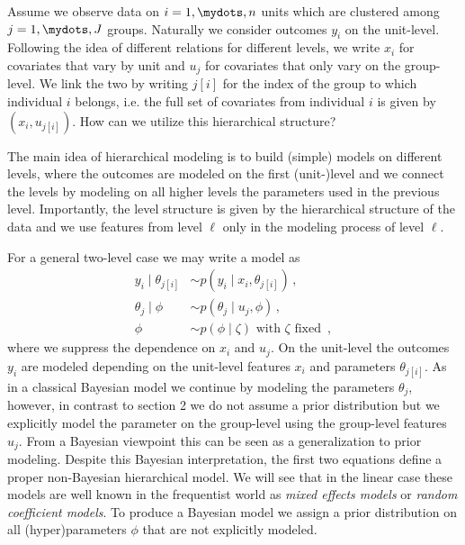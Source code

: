 \noindent
Assume we observe data on $i=1,\mydots,n$ units which are clustered among $j=1,\mydots,J$ groups.
Naturally we consider outcomes $y_i$ on the unit-level.
Following the idea of different relations for different levels, we write $x_i$ for covariates that vary by unit and $u_j$ for covariates that only vary on the group-level.
We link the two by writing $j[i]$ for the index of the group to which individual $i$ belongs, i.e. the full set of covariates from individual $i$ is given by $(x_i, u_{j[i]})$.
How can we utilize this hierarchical structure?

The main idea of hierarchical modeling is to build (simple) models on different levels, where the outcomes are modeled on the first (unit-)level and we connect the levels by modeling on all higher levels the parameters used in the previous level.
Importantly, the level structure is given by the hierarchical structure of the data and we use features from level $\ell$ only in the modeling process of level $\ell$.

For a general two-level case we may write a model as
\begin{align}
  y_i \mid \theta_{j[i]} &\sim p(y_i \mid x_i, \theta_{j[i]}) \,,\tag{Unit Level}\\
  \theta_j \mid \phi &\sim p(\theta_j \mid u_j, \phi) \,,\tag{Group Level}\\
  \phi &\sim p(\phi \mid \zeta) \text{ with } \zeta \text{ fixed } \,, \tag{Prior}
\end{align}
where we suppress the dependence on $x_i$ and $u_j$.
On the unit-level the outcomes $y_i$ are modeled depending on the unit-level features $x_i$ and parameters $\theta_{j[i]}$.
As in a classical Bayesian model we continue by modeling the parameters $\theta_j$, however, in contrast to section 2 we do not assume a prior distribution but we explicitly model the parameter on the group-level using the group-level features $u_j$.
From a Bayesian viewpoint this can be seen as a generalization to prior modeling.
Despite this Bayesian interpretation, the first two equations define a proper non-Bayesian hierarchical model.
We will see that in the linear case these models are well known in the frequentist world as \emph{mixed effects models} or \emph{random coefficient models}.
To produce a Bayesian model we assign a prior distribution on all (hyper)parameters $\phi$ that are not explicitly modeled.

